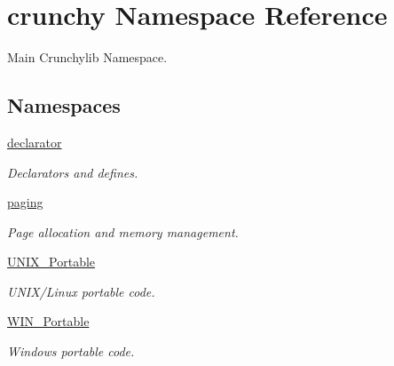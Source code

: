 \hypertarget{namespacecrunchy}{}\section{crunchy Namespace Reference}
\label{namespacecrunchy}


Main Crunchylib Namespace.  


\subsection*{Namespaces}
\begin{DoxyCompactItemize}
\item 
 \hyperlink{namespacecrunchy_1_1declarator}{declarator}
\begin{DoxyCompactList}\small\item\em Declarators and defines. \end{DoxyCompactList}\item 
 \hyperlink{namespacecrunchy_1_1paging}{paging}
\begin{DoxyCompactList}\small\item\em Page allocation and memory management. \end{DoxyCompactList}\item 
 \hyperlink{namespacecrunchy_1_1_u_n_i_x___portable}{U\+N\+I\+X\+\_\+\+Portable}
\begin{DoxyCompactList}\small\item\em U\+N\+I\+X/\+Linux portable code. \end{DoxyCompactList}\item 
 \hyperlink{namespacecrunchy_1_1_w_i_n___portable}{W\+I\+N\+\_\+\+Portable}
\begin{DoxyCompactList}\small\item\em Windows portable code. \end{DoxyCompactList}\end{DoxyCompactItemize}
